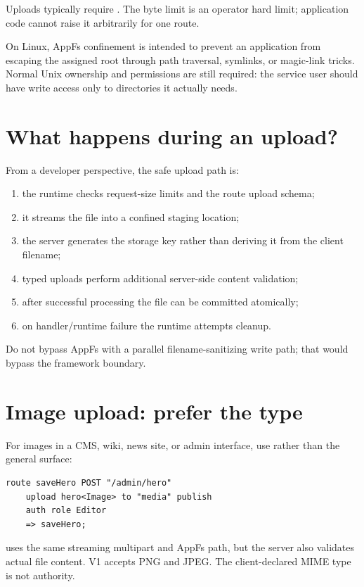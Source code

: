 Uploads typically require . The byte limit is an operator hard limit; application code cannot raise it arbitrarily for one route.

On Linux, AppFs confinement is intended to prevent an application from escaping the assigned root through path traversal, symlinks, or magic-link tricks. Normal Unix ownership and permissions are still required: the service user should have write access only to directories it actually needs.

\section{What happens during an upload?}

From a developer perspective, the safe upload path is:

\begin{enumerate}
  \item the runtime checks request-size limits and the route upload schema;
  \item it streams the file into a confined staging location;
  \item the server generates the storage key rather than deriving it from the client filename;
  \item typed uploads perform additional server-side content validation;
  \item after successful processing the file can be committed atomically;
  \item on handler/runtime failure the runtime attempts cleanup.
\end{enumerate}

Do not bypass AppFs with a parallel filename-sanitizing write path; that would bypass the framework boundary.

\section{Image upload: prefer the  type}

For images in a CMS, wiki, news site, or admin interface, use  rather than the general  surface:

\begin{lstlisting}[language=Velran]
route saveHero POST "/admin/hero"
    upload hero<Image> to "media" publish
    auth role Editor
    => saveHero;
\end{lstlisting}

 uses the same streaming multipart and AppFs path, but the server also validates actual file content. V1 accepts PNG and JPEG. The client-declared MIME type is not authority.

